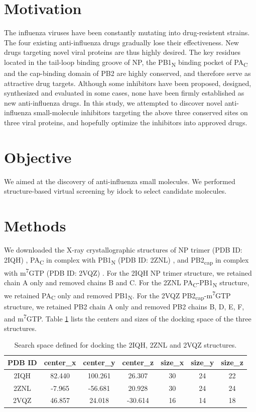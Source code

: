 \section{Motivation}

The influenza viruses have been constantly mutating into drug-resistent strains. The four existing anti-influenza drugs gradually lose their effectiveness. New drugs targeting novel viral proteins are thus highly desired. The key residues located in the tail-loop binding groove of NP, the PB1\textsubscript{N} binding pocket of PA\textsubscript{C} and the cap-binding domain of PB2 are highly conserved, and therefore serve as attractive drug targets. Although some inhibitors have been proposed, designed, synthesized and evaluated in some cases, none have been firmly established as new anti-influenza drugs. In this study, we attempted to discover novel anti-influenza small-molecule inhibitors targeting the above three conserved sites on three viral proteins, and hopefully optimize the inhibitors into approved drugs.

\section{Objective}

We aimed at the discovery of anti-influenza small molecules. We performed structure-based virtual screening by idock \citep{1153} to select candidate molecules.

\section{Methods}

We downloaded the X-ray crystallographic structures of NP trimer (PDB ID: 2IQH) \citep{1140}, PA\textsubscript{C} in complex with PB1\textsubscript{N} (PDB ID: 2ZNL) \citep{1141}, and PB2\textsubscript{cap} in complex with m\textsuperscript{7}GTP (PDB ID: 2VQZ) \citep{1192}. For the 2IQH NP trimer structure, we retained chain A only and removed chains B and C. For the 2ZNL PA\textsubscript{C}-PB1\textsubscript{N} structure, we retained PA\textsubscript{C} only and removed PB1\textsubscript{N}. For the 2VQZ PB2\textsubscript{cap}-m\textsuperscript{7}GTP structure, we retained PB2 chain A only and removed PB2 chains B, D, E, F, and m\textsuperscript{7}GTP. Table \ref{influenza:SearchSpace} lists the centers and sizes of the docking space of the three structures.

\begin{table}
\caption{Search space defined for docking the 2IQH, 2ZNL and 2VQZ structures.}
\label{influenza:SearchSpace}
\begin{tabular}{ccccccc}
\hline
PDB ID & center\_x & center\_y & center\_z & size\_x & size\_y & size\_z\\
\hline
2IQH & 82.440 & 100.261 & 26.307 & 30 & 24 & 22\\
2ZNL & -7.965 & -56.681 & 20.928 & 30 & 24 & 24\\
2VQZ & 46.857 & 24.018 & -30.614 & 16 & 14 & 18\\
\hline
\end{tabular}
\end{table}

